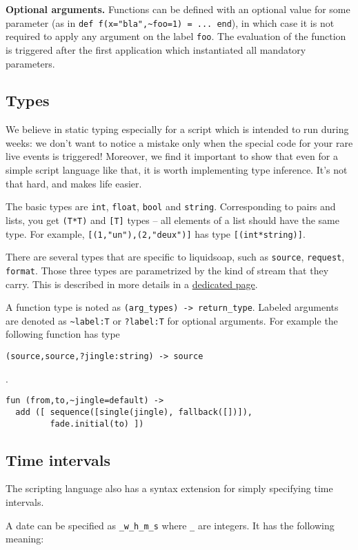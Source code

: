 \textbf{Optional arguments.} Functions can be defined with an optional value for some parameter (as in \verb+def f(x="bla",~foo=1) = ... end+), in which case it is not required to apply any argument on the label \verb+foo+. The evaluation of the function is triggered after the first application which instantiated all mandatory parameters.

\subsection{Types}
We believe in static typing especially for a script which is intended to run during weeks: we don't want to notice a mistake only when the special code for your rare live events is triggered! Moreover, we find it important to show that even for a simple script language like that, it is worth implementing type inference. It's not that hard, and makes life easier.

The basic types are \verb+int+, \verb+float+, \verb+bool+ 
and \verb+string+.
Corresponding to pairs and lists,
you get \verb+(T*T)+ and \verb+[T]+ types --
all elements of a list should have the same type.
For example, \verb+[(1,"un"),(2,"deux")]+
has type \verb+[(int*string)]+.

There are several types that are specific to liquidsoap, such as
\verb+source+, \verb+request+, \verb+format+.
Those three types are parametrized by the kind of stream that they
carry. This is described in more details in a
\href{stream_content.html}{dedicated page}.

A function type is noted as \verb+(arg_types) -> return_type+. Labeled arguments are denoted as \verb+~label:T+ or \verb+?label:T+ for optional arguments. For example the following function has type \begin{verbatim}
(source,source,?jingle:string) -> source
\end{verbatim}
.

\begin{verbatim}
fun (from,to,~jingle=default) ->
  add ([ sequence([single(jingle), fallback([])]),
         fade.initial(to) ])
\end{verbatim}
\subsection{Time intervals}
The scripting language also has a syntax extension for simply specifying time intervals.

A date can be specified as \verb+_w_h_m_s+ where \verb+_+ are integers. It has the following meaning:

